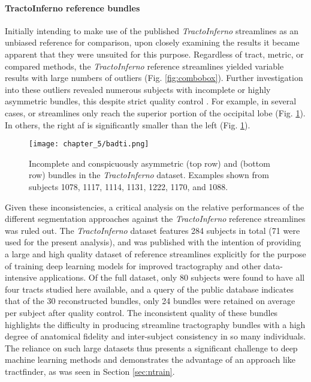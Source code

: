 \documentclass[12pt,phd,a4paper,twoside]{ucl_thesis}
\begin{document}
\paragraph*{TractoInferno reference bundles}



Initially intending to make use of the published \textit{TractoInferno} streamlines as an unbiased reference for comparison, upon closely examining the results it became apparent that they were unsuited for this purpose.
Regardless of tract, metric, or compared methods, the \textit{TractoInferno} reference streamlines yielded variable results with large numbers of outliers (Fig. \ref{fig:combobox}).
Further investigation into these outliers revealed numerous subjects with incomplete or highly asymmetric bundles, this despite strict quality control \autocite{Poulin2022a}.
For example, in several cases, \gls{or} streamlines only reach the superior portion of the occipital lobe (Fig. \ref{fig:duds}).
In others, the right \gls{af} is significantly smaller than the left (Fig. \ref{fig:duds}).

\begin{figure}[h!]
  \centering
  \texttt{[image: chapter\_5/badti.png]}
  \caption[Incomplete bundles in the \textit{TractoInferno} reference data]{Incomplete and conspicuously asymmetric  (top row) and  (bottom row) bundles in the \textit{TractoInferno} dataset. Examples shown from subjects 1078, 1117, 1114, 1131, 1222, 1170, and 1088.}
  \label{fig:duds}
\end{figure}

Given these inconsistencies, a critical analysis on the relative performances of the different segmentation approaches against the \textit{TractoInferno} reference streamlines was ruled out.
The \textit{TractoInferno} dataset features 284 subjects in total (71 were used for the present analysis), and was published with the intention of providing a large and high quality dataset of reference streamlines explicitly for the purpose of training deep learning models for improved tractography and other data-intensive applications.
Of the full dataset, only 80 subjects were found to have all four tracts studied here available, and a query of the public database\autocite{Poulin2022a} indicates that of the 30 reconstructed bundles, only 24 bundles were retained on average per subject after quality control.
The inconsistent quality of these bundles highlights the difficulty in producing streamline tractography bundles with a high degree of anatomical fidelity and inter-subject consistency in so many individuals.
The reliance on such large datasets thus presents a significant challenge to deep machine learning methods and demonstrates the advantage of an approach like tractfinder, as was seen in Section \ref{sec:ntrain}.
\end{document}
